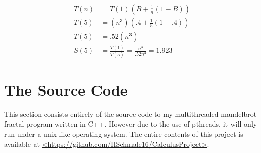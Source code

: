 \documentclass[10pt,oneside,letter]{article}
\begin{document}
\begin{equation} \label{eq:speedup5threads}
    \begin{align}
        T(n)&= T(1)(B + \frac{1}{n}(1-B))\\
        T(5)&= (n^3)(.4 + \frac{1}{5}(1-.4))\\
        T(5)&= .52(n^3)\\
        S(5)&= \frac{T(1)}{T(5)} = \frac{n^3}{.52n^3} = 1.923
    \end{align}
\end{equation}

\section{The Source Code}
This section consists entirely of the source code to my multithreaded
mandelbrot fractal program written in C++. However due to the use of
pthreads, it will only run under a unix-like operating system. The 
entire contents of this project is available at 
\url{<https://github.com/HSchmale16/CalculusProject>}.

\end{document}
